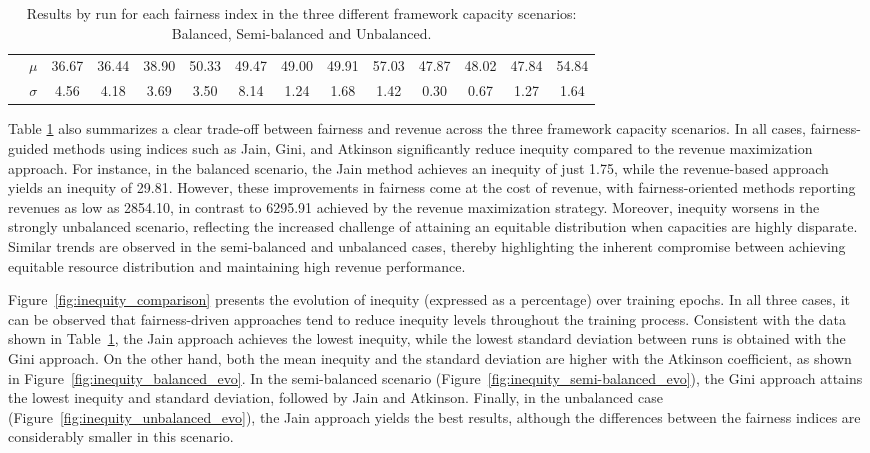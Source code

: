 \documentclass[preprint,12pt]{elsarticle}
\begin{document}
\begin{table}[htbp]
\begin{adjustbox}{max width=\textwidth}
\begin{tabular}{|c|c|cccc|cccc|cccc|}
   & $\mu$    & 36.67   & 36.44   & 38.90   & 50.33   & 49.47   & 49.00   & 49.91   & 57.03   & 47.87   & 48.02   & 47.84   & 54.84 \\
\cline{2-14}
   & $\sigma$ & 4.56    & 4.18    & 3.69    & 3.50    & 8.14    & 1.24    & 1.68    & 1.42    & 0.30    & 0.67    & 1.27    & 1.64 \\
\hline
\end{tabular}
\end{adjustbox}
\caption{Results by run for each fairness index in the three different framework capacity scenarios: Balanced, Semi-balanced and Unbalanced.}
\label{tab:comparison_summarized}
\end{table}

Table \ref{tab:comparison_summarized} also summarizes a clear trade-off between fairness and revenue across the three framework capacity scenarios. In all cases, fairness-guided methods using indices such as Jain, Gini, and Atkinson significantly reduce inequity compared to the revenue maximization approach. For instance, in the balanced scenario, the Jain method achieves an inequity of just 1.75, while the revenue-based approach yields an inequity of 29.81. However, these improvements in fairness come at the cost of revenue, with fairness-oriented methods reporting revenues as low as 2854.10, in contrast to 6295.91 achieved by the revenue maximization strategy. Moreover, inequity worsens in the strongly unbalanced scenario, reflecting the increased challenge of attaining an equitable distribution when capacities are highly disparate. Similar trends are observed in the semi-balanced and unbalanced cases, thereby highlighting the inherent compromise between achieving equitable resource distribution and maintaining high revenue performance.

Figure~\ref{fig:inequity_comparison} presents the evolution of inequity (expressed as a percentage) over training epochs. In all three cases, it can be observed that fairness-driven approaches tend to reduce inequity levels throughout the training process. Consistent with the data shown in Table~\ref{tab:comparison_summarized}, the Jain approach achieves the lowest inequity, while the lowest standard deviation between runs is obtained with the Gini approach. On the other hand, both the mean inequity and the standard deviation are higher with the Atkinson coefficient, as shown in Figure~\ref{fig:inequity_balanced_evo}. In the semi-balanced scenario (Figure~\ref{fig:inequity_semi-balanced_evo}), the Gini approach attains the lowest inequity and standard deviation, followed by Jain and Atkinson. Finally, in the unbalanced case (Figure~\ref{fig:inequity_unbalanced_evo}), the Jain approach yields the best results, although the differences between the fairness indices are considerably smaller in this scenario.
\end{document}
